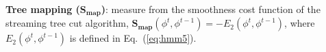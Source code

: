 %
%
%


\noindent\textbf{\normalsize Tree mapping ($\bm{S_{map}}$)}:
 measure  from the smoothness cost function of the streaming tree cut algorithm, $\bm{S_{map}}(\phi^t,\phi^{t-1})=-E_2{(\phi^t,\phi^{t-1})}$,
where $E_2{(\phi^t,\phi^{t-1})}$ is defined in Eq.~(\ref{eq:hmm5}).

